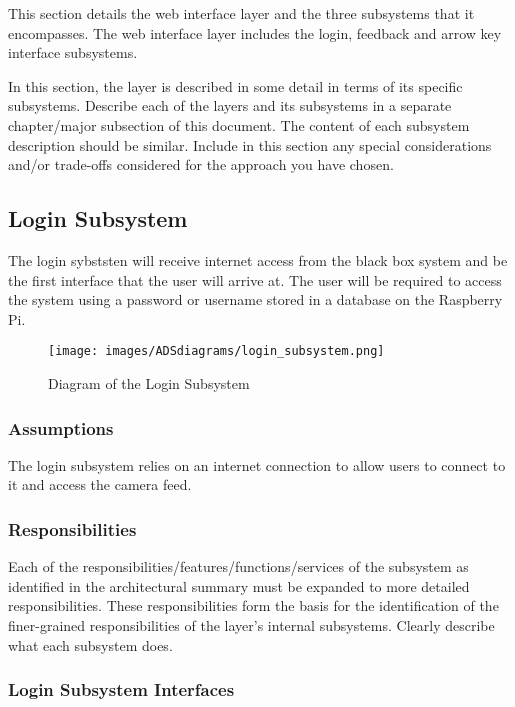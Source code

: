 This section details the web interface layer and the three subsystems that it encompasses. The web interface layer includes the login, feedback and arrow key interface subsystems.


In this section, the layer is described in some detail in terms of its specific subsystems. Describe each of the layers and its subsystems in a separate chapter/major subsection of this document. The content of each subsystem description should be similar. Include in this section any special considerations and/or trade-offs considered for the approach you have chosen.

\subsection{Login Subsystem}
The login sybststen will receive internet access from the black box system and be the first interface that the user will arrive at. The user will be required to access the system using a password or username stored in a database on the Raspberry Pi.

\begin{figure}[h!]
	\centering
 	\texttt{[image: images/ADSdiagrams/login\_subsystem.png]}
 \caption{Diagram of the Login Subsystem}
\end{figure}

\subsubsection{Assumptions}
The login subsystem relies on an internet connection to allow users to connect to it and access the camera feed.

\subsubsection{Responsibilities}
Each of the responsibilities/features/functions/services of the subsystem as identified in the architectural summary must be expanded to more detailed responsibilities. These responsibilities form the basis for the identification of the finer-grained responsibilities of the layer's internal subsystems. Clearly describe what each subsystem does.

\subsubsection{Login Subsystem  Interfaces}

